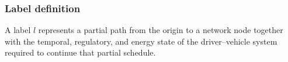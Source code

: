 \documentclass[3p,11pt,authoryear]{elsarticle}  %
\begin{document}

\subsubsection{Label definition}

A label \(l\) represents a partial path from the origin to a network node together with the temporal, regulatory, and energy state of the driver--vehicle system required to continue that partial schedule.
\end{document}
